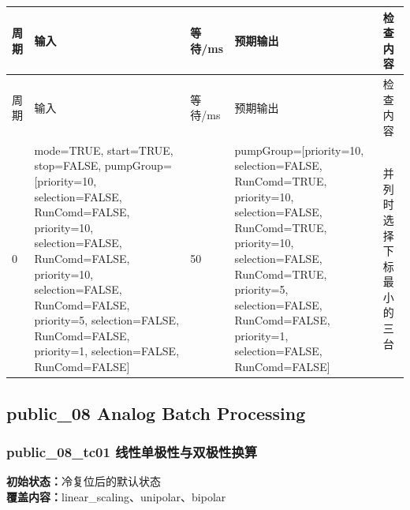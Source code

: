 \begin{longtable}{L{1.0cm}L{4.7cm}L{1.4cm}L{4.0cm}L{2.1cm}}

\toprule

周期 & 输入 & 等待/ms & 预期输出 & 检查内容\\

\midrule

\endfirsthead

\toprule

周期 & 输入 & 等待/ms & 预期输出 & 检查内容\\

\midrule

\endhead

0 & mode=TRUE, start=TRUE, stop=FALSE, pumpGroup=[priority=10, selection=FALSE, RunComd=FALSE, priority=10, selection=FALSE, RunComd=FALSE, priority=10, selection=FALSE, RunComd=FALSE, priority=5, selection=FALSE, RunComd=FALSE, priority=1, selection=FALSE, RunComd=FALSE] & 50 & pumpGroup=[priority=10, selection=FALSE, RunComd=TRUE, priority=10, selection=FALSE, RunComd=TRUE, priority=10, selection=FALSE, RunComd=TRUE, priority=5, selection=FALSE, RunComd=FALSE, priority=1, selection=FALSE, RunComd=FALSE] & 并列时选择下标最小的三台\\

\bottomrule

\end{longtable}

\subsection{{\ttfamily public\_08} Analog Batch Processing}

\subsubsection{{\ttfamily public\_08\_tc01} 线性单极性与双极性换算}

\noindent\textbf{初始状态：}冷复位后的默认状态\\

\textbf{覆盖内容：}linear\_scaling、unipolar、bipolar

